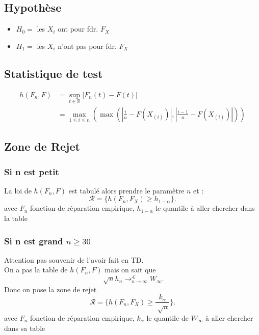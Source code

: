 \documentclass{article}
\theoremstyle{plain}%
\theoremstyle{definition}
\theoremstyle{remark}
\begin{document}
\subsection*{Hypothèse}
\begin{itemize}
    \item $ H_0 = $ les $ X_i $ ont pour fdr. $ F_X $ 
    \item $ H_1 = $ les $ X_i $ n'ont pas pour fdr. $ F_X $ 
\end{itemize}

\subsection*{Statistique de test} 
\begin{align*}
    h(F_n, F) &= \sup _{t \in \mathbb{R}} \left| F_n(t) - F(t) \right| \\
        &= \max _{1 \leq i \leq n} ( \max ( \left| \frac{i}{n} - F(X_{(i)}) \right| , \left| \frac{i-1}{n}- F(X_{(i)}) \right|  ))
\end{align*}    

\subsection*{Zone de Rejet}
\subsubsection*{Si n est petit}
La loi de $ h(F_n, F) $ est tabulé alors prendre le paramètre $ n $ et :
\[
    \mathcal{R} = \{h(F_n, F_X) \geq h_{1-\alpha }\}
.\]
avec $ F_n $ fonction de réparation empirique, $ h_{1 -\alpha } $ le quantile à aller chercher dans la table 

\subsubsection*{Si n est grand $ n \geq 30 $ }
Attention pas souvenir de l'avoir fait en TD. \\
On a pas la table de $ h(F_n, F) $ mais on sait que 
\[
    \sqrt[]{n}h_n \to ^{\mathcal{L}}_{n \to \infty } W_{\infty }
.\]
Donc on pose la zone de rejet 
\[
    \mathcal{R} = \{h(F_n, F_X) \geq \frac{k_\alpha }{\sqrt[]{n}} \}
.\]
avec $ F_n $ fonction de réparation empirique, $ k_{\alpha } $ le quantile de $ W_\infty  $ à aller chercher dans sa table 
\end{document}
